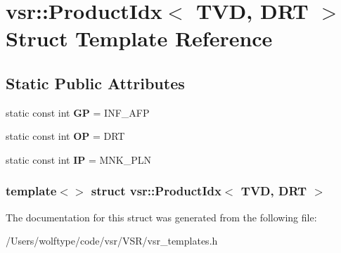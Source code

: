 \hypertarget{structvsr_1_1_product_idx_3_01_t_v_d_00_01_d_r_t_01_4}{\section{vsr\-:\-:Product\-Idx$<$ T\-V\-D, D\-R\-T $>$ Struct Template Reference}
\label{structvsr_1_1_product_idx_3_01_t_v_d_00_01_d_r_t_01_4}
}
\subsection*{Static Public Attributes}
\begin{DoxyCompactItemize}
\item 
\hypertarget{structvsr_1_1_product_idx_3_01_t_v_d_00_01_d_r_t_01_4_a2f983121497d2cc69e0d0b88294d3ab7}{static const int {\bfseries G\-P} = I\-N\-F\-\_\-\-A\-F\-P}\label{structvsr_1_1_product_idx_3_01_t_v_d_00_01_d_r_t_01_4_a2f983121497d2cc69e0d0b88294d3ab7}

\item 
\hypertarget{structvsr_1_1_product_idx_3_01_t_v_d_00_01_d_r_t_01_4_a0dfa26823e44bf95f031919306ae2c40}{static const int {\bfseries O\-P} = D\-R\-T}\label{structvsr_1_1_product_idx_3_01_t_v_d_00_01_d_r_t_01_4_a0dfa26823e44bf95f031919306ae2c40}

\item 
\hypertarget{structvsr_1_1_product_idx_3_01_t_v_d_00_01_d_r_t_01_4_a444d8fc3bf9457754e1d42732f7da9f3}{static const int {\bfseries I\-P} = M\-N\-K\-\_\-\-P\-L\-N}\label{structvsr_1_1_product_idx_3_01_t_v_d_00_01_d_r_t_01_4_a444d8fc3bf9457754e1d42732f7da9f3}

\end{DoxyCompactItemize}
\subsubsection*{template$<$$>$ struct vsr\-::\-Product\-Idx$<$ T\-V\-D, D\-R\-T $>$}



The documentation for this struct was generated from the following file\-:\begin{DoxyCompactItemize}
\item 
/\-Users/wolftype/code/vsr/\-V\-S\-R/vsr\-\_\-templates.\-h\end{DoxyCompactItemize}
